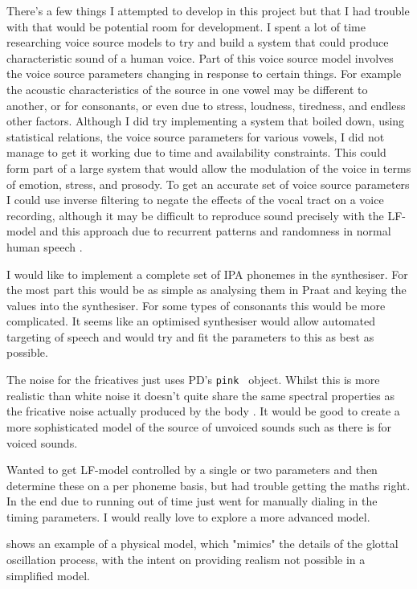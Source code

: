 There's a few things I attempted to develop in this project but that I had trouble with that would be potential room for development. I spent a lot of time researching voice source models to try and build a system that could produce characteristic sound of a human voice. Part of this voice source model involves the voice source parameters changing in response to certain things. For example the acoustic characteristics of the source in one vowel may be different to another, or for consonants, or even due to stress, loudness, tiredness, and endless other factors. Although I did try implementing a system that boiled down, using statistical relations, the voice source parameters for various vowels, I did not manage to get it working due to time and availability constraints. 
This could form part of a large system that would allow the modulation of the voice in terms of emotion, stress, and prosody.
To get an accurate set of voice source parameters I could use inverse filtering to negate the effects of the vocal tract on a voice recording, although it may be difficult to reproduce sound precisely with the LF-model and this approach due to recurrent patterns and randomness in normal human speech \cite{Fant1995}.

I would like to implement a complete set of IPA phonemes in the synthesiser. For the most part this would be as simple as analysing them in Praat and keying the values into the synthesiser. For some types of consonants this would be more complicated. It seems like an optimised synthesiser would allow automated targeting of speech and would try and fit the parameters to this as best as possible.

The noise for the fricatives just uses PD's \texttt{pink~} object. Whilst this is more realistic than white noise it doesn't quite share the same spectral properties as the fricative noise actually produced by the body \cite{Johnson2003}. It would be good to create a more sophisticated model of the source of unvoiced sounds such as there is for voiced sounds.


Wanted to get LF-model controlled by a single or two parameters and then determine these on a per phoneme basis, but had trouble getting the maths right. In the end due to running out of time just went for manually dialing in the timing parameters. I would really love to explore a more advanced model.

\cite{Liljencrants1995} shows an example of a physical model, which "mimics" the details of the glottal oscillation process, with the intent on providing realism not possible in a simplified model. 

